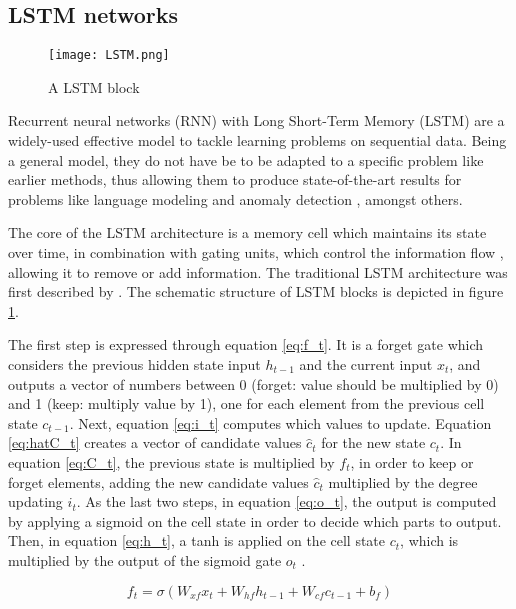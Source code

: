 \subsection{LSTM networks \label{sec:lstm}}
\begin{figure}[h]
  \centering
  \texttt{[image: LSTM.png]}\\
  \caption{A LSTM block \cite{graves2013speech}}
  \label{fig:lstm_blocks}
\end{figure}


Recurrent neural networks (RNN) with Long Short-Term Memory (LSTM) are a widely-used effective model to tackle learning problems on sequential data. Being a general model, they do not have be to be adapted to a specific problem like earlier methods, thus allowing them to produce state-of-the-art results for problems like language modeling \cite{peters2018deep} and anomaly detection \cite{du2017deeplog}, amongst others.

The core of the LSTM architecture is a memory cell which maintains its state over time, in combination with gating units, which control the information flow \cite{greff2016lstm}, allowing it to remove or add information. The traditional LSTM architecture was first described by \cite{graves2005framewise}. The schematic structure of LSTM blocks is depicted in figure \ref{fig:lstm_blocks}. 

The first step is expressed through equation \ref{eq:f_t}. It is a forget gate which considers the previous hidden state input $h_{t-1}$ and the current input $x_t$, and outputs a vector of numbers between 0 (forget: value should be multiplied by 0) and 1 (keep: multiply value by 1), one for each element from the previous cell state $c_{t-1}$. Next, equation \ref{eq:i_t} computes which values to update. Equation \ref{eq:hatC_t} creates a vector of candidate values $\hat{c}_t$ for the new state $c_t$. In equation \ref{eq:C_t}, the previous state is multiplied by $f_t$, in order to keep or forget elements, adding the new candidate values $\hat{c}_t$ multiplied by the degree updating $i_t$. As the last two steps, in equation \ref{eq:o_t}, the output is computed by applying a sigmoid on the cell state in order to decide which parts to output. Then, in equation \ref{eq:h_t}, a tanh is applied on the cell state $c_t$, which is multiplied by the output of the sigmoid gate $o_t$ \cite{colahlstm} \cite{graves2013speech}.

\begin{equation} \label{eq:f_t}
	f_t = \sigma(W_{xf}x_t + W_{hf}h_{t-1} + W_{cf}c_{t-1} + b_f)
\end{equation}

